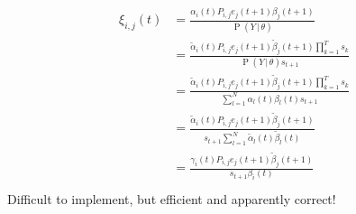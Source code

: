 \documentclass{article}
\DeclareMathOperator{\Prob}{P}
\begin{document}
\begin{align}
    \begin{split}
        \xi_{i,j}(t) &= 
                 \frac{\alpha_i(t)P_{i,j}e_j(t+1)\beta_j(t+1)}
                 {\Prob(Y\,|\,\theta)} \\
                 &= 
                 \frac{\tilde{\alpha}_i(t)P_{i,j}e_j(t+1)\tilde{\beta}_j(t+1)\prod_{k=1}^Ts_k}
                 {\Prob(Y\,|\,\theta)s_{t+1}} \\
                 &= 
                 \frac{\tilde{\alpha}_i(t)P_{i,j}e_j(t+1)\tilde{\beta}_j(t+1)\prod_{k=1}^Ts_k}
                 {\sum_{l=1}^N\alpha_l(t)\beta_l(t)s_{t+1}} \\
                 &= 
                 \frac{\tilde{\alpha}_i(t)P_{i,j}e_j(t+1)\tilde{\beta}_j(t+1)}
                 {s_{t+1}\sum_{l=1}^N\tilde{\alpha}_l(t)\tilde{\beta}_l(t)} \\
                 &= 
                 \frac{\gamma_i(t)P_{i,j}e_j(t+1)\tilde{\beta}_j(t+1)}
                 {s_{t+1}\beta_i(t)} \\
    \end{split}
\end{align}
Difficult to implement, but efficient and apparently correct!
\end{document}

